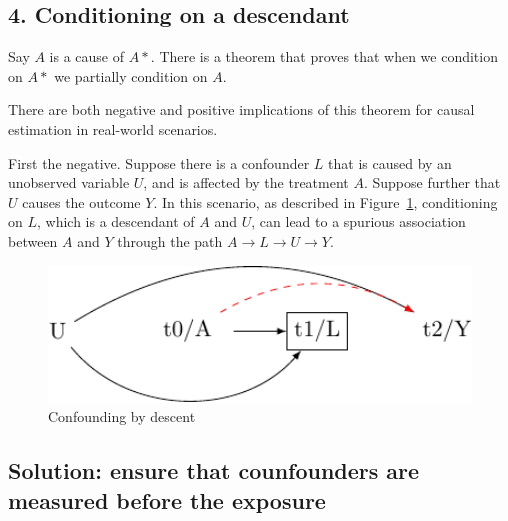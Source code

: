 \documentclass[
  singlecolumn]{report}
\begin{document}
\hypertarget{conditioning-on-a-descendant}{%
\subsection{4. Conditioning on a
descendant}\label{conditioning-on-a-descendant}}

Say \(A\) is a cause of \(A*\). There is a theorem that proves that when
we condition on \(A*\) we partially condition on \(A\).

There are both negative and positive implications of this theorem for
causal estimation in real-world scenarios.

First the negative. Suppose there is a confounder \(L\) that is caused
by an unobserved variable \(U\), and is affected by the treatment \(A\).
Suppose further that \(U\) causes the outcome \(Y\). In this scenario,
as described in Figure~\ref{fig-dag-descendent}, conditioning on \(L\),
which is a descendant of \(A\) and \(U\), can lead to a spurious
association between \(A\) and \(Y\) through the path
\(A \to L \to U \to Y\).

\begin{figure}

{\centering \includegraphics[width=1\textwidth,height=\textheight]{causal-dags_files/figure-pdf/fig-dag-descendent-1.pdf}

}

\caption{\label{fig-dag-descendent}Confounding by descent}

\end{figure}

\hypertarget{solution-ensure-that-counfounders-are-measured-before-the-exposure}{%
\subsection{Solution: ensure that counfounders are measured before the
exposure}\label{solution-ensure-that-counfounders-are-measured-before-the-exposure}}
\end{document}
